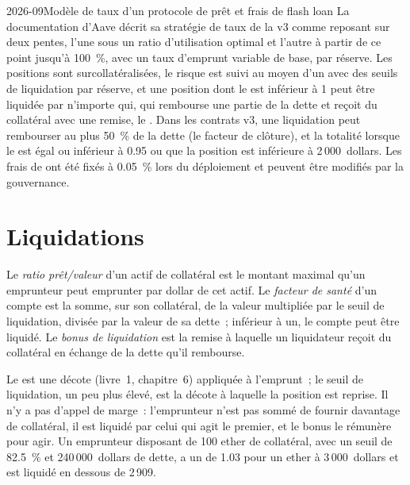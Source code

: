 \begin{dated}{2026-09}{Modèle de taux d'un protocole de prêt et frais de flash loan}\label{dat:m3:defi-credit-and-leverage:aave}
La documentation d'Aave décrit sa stratégie de taux de la v3 comme reposant sur deux pentes, l'une sous un ratio d'utilisation optimal et l'autre à partir
de ce point jusqu'à 100~\%, avec un taux d'emprunt variable de base, par réserve. Les positions sont surcollatéralisées, le risque est suivi au moyen d'un 
avec des seuils de liquidation par réserve, et une position dont le  est inférieur à 1 peut être liquidée par n'importe qui, qui rembourse une partie de la
dette et reçoit du collatéral avec une remise, le . Dans les contrats v3, une liquidation peut rembourser au plus 50~\% de la dette
(le facteur de clôture), et la totalité lorsque le  est égal ou inférieur à 0.95 ou que la position est inférieure à 2\,000~dollars. Les frais de  ont été fixés à 0.05~\%
lors du déploiement et peuvent être modifiés par la gouvernance.
\end{dated}

\section{Liquidations}

\begin{definition}\label{def:m3:defi-credit-and-leverage:ltv}
Le \emph{ratio prêt/valeur} d'un actif de collatéral est le montant maximal qu'un emprunteur peut emprunter par dollar de cet actif. Le
\emph{facteur de santé} d'un compte est la somme, sur son collatéral, de la valeur multipliée par le seuil de liquidation, divisée par la
valeur de sa dette~; inférieur à un, le compte peut être liquidé. Le \emph{bonus de liquidation} est la remise à laquelle un
liquidateur reçoit du collatéral en échange de la dette qu'il rembourse.
\end{definition}

Le  est une décote (livre~1, chapitre~6) appliquée à l'emprunt~; le seuil de liquidation, un peu plus élevé, est la
décote à laquelle la position est reprise. Il n'y a pas d'appel de marge~: l'emprunteur n'est pas sommé de fournir davantage de collatéral, il est liquidé par celui qui
agit le premier, et le bonus le rémunère pour agir. Un emprunteur disposant de 100 ether de collatéral, avec un seuil de 82.5~\% et 240\,000~dollars de dette, a un
 de 1.03 pour un ether à 3\,000~dollars et est liquidé en dessous de 2\,909.

